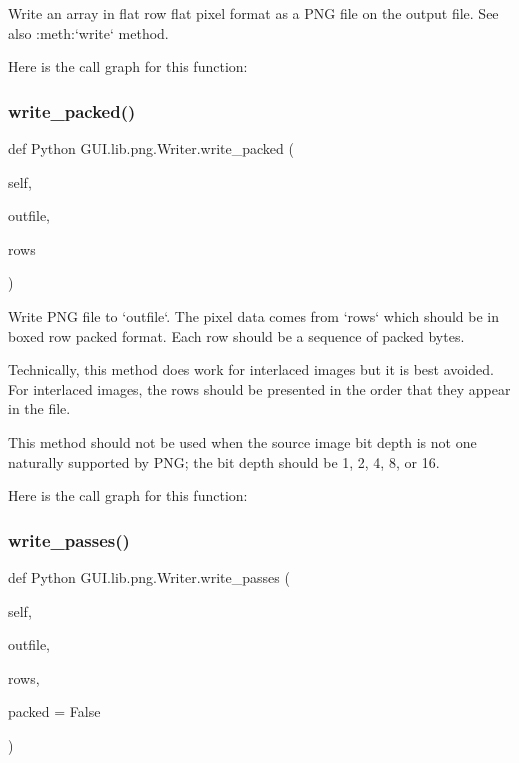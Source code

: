 \begin{DoxyVerb}Write an array in flat row flat pixel format as a PNG file on
the output file.  See also :meth:`write` method.
\end{DoxyVerb}
 Here is the call graph for this function\+:
\mbox{\label{class_python_01_g_u_i_1_1lib_1_1png_1_1_writer_a59b10b0d8ae08b87d807260764a37d8e}} 
\subsubsection{\texorpdfstring{write\+\_\+packed()}{write\_packed()}}
{\footnotesize\ttfamily def Python G\+U\+I.\+lib.\+png.\+Writer.\+write\+\_\+packed (\begin{DoxyParamCaption}\item[{}]{self,  }\item[{}]{outfile,  }\item[{}]{rows }\end{DoxyParamCaption})}

\begin{DoxyVerb}Write PNG file to `outfile`.  The pixel data comes from `rows`
which should be in boxed row packed format.  Each row should be
a sequence of packed bytes.

Technically, this method does work for interlaced images but it
is best avoided.  For interlaced images, the rows should be
presented in the order that they appear in the file.

This method should not be used when the source image bit depth
is not one naturally supported by PNG; the bit depth should be
1, 2, 4, 8, or 16.
\end{DoxyVerb}
 Here is the call graph for this function\+:
\mbox{\label{class_python_01_g_u_i_1_1lib_1_1png_1_1_writer_a9590bc26c068a9a4f6374d0d3246c2a3}} 
\subsubsection{\texorpdfstring{write\+\_\+passes()}{write\_passes()}}
{\footnotesize\ttfamily def Python G\+U\+I.\+lib.\+png.\+Writer.\+write\+\_\+passes (\begin{DoxyParamCaption}\item[{}]{self,  }\item[{}]{outfile,  }\item[{}]{rows,  }\item[{}]{packed = {\ttfamily False} }\end{DoxyParamCaption})}

